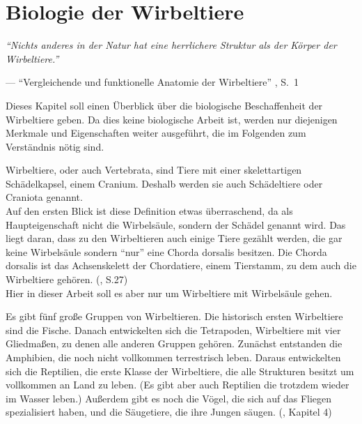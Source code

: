 \chapter{Biologie der Wirbeltiere}
\label{chapter:biology}

\begin{center}
 \begin{minipage}{12cm}
  \emph{"`Nichts anderes in der Natur hat eine herrlichere Struktur als der Körper der Wirbeltiere."'}
 
  --- "`Vergleichende und funktionelle Anatomie der Wirbeltiere"' \cite{Vergleichende_Anatomie}, S.\ 1
 \end{minipage}
\end{center}

Dieses Kapitel soll einen Überblick über die biologische Beschaffenheit der Wirbeltiere geben. Da dies keine biologische Arbeit ist, werden nur diejenigen Merkmale und Eigenschaften weiter ausgeführt, die im Folgenden zum Verständnis nötig sind.

Wirbeltiere, oder auch Vertebrata, sind Tiere mit einer skelettartigen Schädelkapsel, einem Cranium. Deshalb werden sie auch Schädeltiere oder Craniota genannt.\\
Auf den ersten Blick ist diese Definition etwas überraschend, da als  Haupteigenschaft nicht die Wirbelsäule, sondern der Schädel genannt wird. Das liegt daran, dass zu den Wirbeltieren auch einige Tiere gezählt werden, die gar keine Wirbelsäule sondern "`nur"' eine Chorda dorsalis besitzen. Die Chorda dorsalis ist das Achsenskelett der Chordatiere, einem Tierstamm, zu dem auch die Wirbeltiere gehören. (\cite{Vergleichende_Anatomie}, S.27) 
\\ %
Hier in dieser Arbeit soll es aber nur um Wirbeltiere mit Wirbelsäule gehen.

Es gibt fünf große Gruppen von Wirbeltieren. Die historisch ersten Wirbeltiere sind die Fische. Danach entwickelten sich die Tetrapoden, Wirbeltiere mit vier Gliedmaßen, zu denen alle anderen Gruppen gehören. Zunächst entstanden die Amphibien, die noch nicht vollkommen terrestrisch leben. Daraus entwickelten sich die Reptilien, die erste Klasse der Wirbeltiere, die alle Strukturen besitzt um vollkommen an Land zu leben. (Es gibt aber auch Reptilien die trotzdem wieder im Wasser leben.) Außerdem gibt es noch die Vögel, die sich auf das Fliegen spezialisiert haben, und die Säugetiere, die ihre Jungen säugen. (\cite{Vergleichende_Anatomie}, Kapitel 4)

